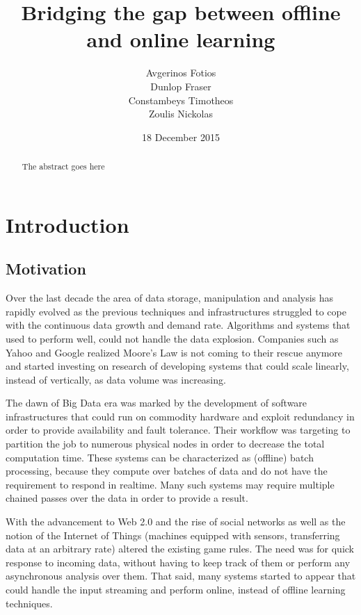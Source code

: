 \documentclass{lmproj}
\begin{document}
\title{Bridging the gap between offline and online learning}
\author{Avgerinos Fotios \\
        Dunlop Fraser \\
        Constambeys Timotheos \\
        Zoulis Nickolas}
\date{18 December 2015}
\maketitle
\begin{abstract}

The abstract goes here

\end{abstract}
\educationalconsent
\tableofcontents
\chapter{Introduction}
\label{intro}

\section{Motivation}
\label{intro}

Over the last decade the area of data storage, manipulation and analysis has rapidly evolved as the previous techniques and infrastructures struggled to cope with the continuous data growth and demand rate. Algorithms and systems that used to perform well, could not handle the data explosion. Companies such as Yahoo and Google realized Moore's Law is not coming to their rescue anymore and started investing on research of developing systems that could scale linearly, instead of vertically, as data volume was increasing. 

The dawn of Big Data era was marked by the development of software infrastructures that could run on commodity hardware and exploit redundancy in order to provide availability and fault tolerance. Their workflow was targeting to partition the job to numerous physical nodes in order to decrease the total computation time. These systems can be characterized as (offline) batch processing, because they compute over batches of data and do not have the requirement to respond in realtime. Many such systems may require multiple chained passes over the data in order to provide a result.

With the advancement to Web 2.0 and the rise of social networks as well as the notion of the Internet of Things (machines equipped with sensors, transferring data at an arbitrary rate) altered the existing game rules. The need was for quick response to incoming data, without having to keep track of them or perform any asynchronous analysis over them. That said, many systems started to appear that could handle the input streaming and perform online, instead of offline learning techniques. 
\end{document}
